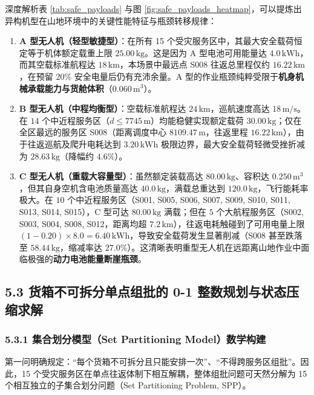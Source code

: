 \documentclass[12pt,a4paper,UTF8]{ctexart}
\begin{document}
深度解析表 \ref{tab:safe_payloads} 与图 \ref{fig:safe_payloads_heatmap}，可以提炼出异构机型在山地环境中的关键性能特征与瓶颈转移规律：
\begin{enumerate}[leftmargin=*]
    \item \textbf{A 型无人机（轻型敏捷型）}：在所有 15 个受灾服务区中，其最大安全载荷恒定等于机体额定载重上限 $25.00\,\text{kg}$。这是因为 A 型电池可用能量达 $4.0\,\text{kWh}$，而其空载标准航程达 $18\,\text{km}$，本场景中最远点 S008 往返总里程仅约 $16.22\,\text{km}$，在预留 $20\%$ 安全电量后仍有充沛余量。A 型的作业瓶颈纯粹受限于\textbf{机身机械承载能力与货舱体积}（$0.060\,\text{m}^3$）。
    \item \textbf{B 型无人机（中程均衡型）}：空载标准航程达 $24\,\text{km}$，巡航速度高达 $18\,\text{m/s}$。在 $14$ 个中近程服务区（$d \le 7745\,\text{m}$）均能稳健实现额定载荷 $30.00\,\text{kg}$；仅在全区最远的服务区 S008（距离调度中心 $8109.47\,\text{m}$，往返里程 $16.22\,\text{km}$），由于往返巡航及爬升电耗达到 $3.20\,\text{kWh}$ 极限边界，最大安全载荷轻微受挫折减为 $28.63\,\text{kg}$（降幅约 $4.6\%$）。
    \item \textbf{C 型无人机（重载大容量型）}：虽然额定装载高达 $80.00\,\text{kg}$、容积达 $0.250\,\text{m}^3$，但其自身空机含电池质量高达 $40.0\,\text{kg}$，满载总重达到 $120.0\,\text{kg}$，飞行能耗率极大。在 $10$ 个中近程服务区（S001, S005, S006, S007, S009, S010, S011, S013, S014, S015），C 型可达 $80.00\,\text{kg}$ 满载；但在 $5$ 个大航程服务区（S002, S003, S004, S008, S012，距离均超 $7.2\,\text{km}$），往返电耗触碰到了可用电量上限 $(1-0.20)\times 8.0 = 6.40\,\text{kWh}$，导致安全载荷发生显著削减（S008 甚至跌落至 $58.44\,\text{kg}$，缩减率达 $27.0\%$）。这清晰表明重型无人机在远距离山地作业中面临极强的\textbf{动力电池能量断崖瓶颈}。
\end{enumerate}

\subsection{5.3 货箱不可拆分单点组批的 0-1 整数规划与状态压缩求解}

\subsubsection{5.3.1 集合划分模型（Set Partitioning Model）数学构建}
第一问明确规定：“每个货箱不可拆分且只能安排一次”、“不得跨服务区组批”。因此，15 个受灾服务区在单点往返体制下相互解耦，整体组批问题可天然分解为 15 个相互独立的子集合划分问题（Set Partitioning Problem, SPP）\cite{balas1976, wolsey2014}。
\end{document}
